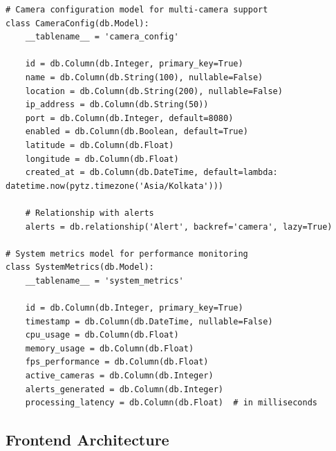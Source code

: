 \documentclass[12pt,a4paper]{article}
\begin{document}
\begin{lstlisting}
# Camera configuration model for multi-camera support
class CameraConfig(db.Model):
    __tablename__ = 'camera_config'
    
    id = db.Column(db.Integer, primary_key=True)
    name = db.Column(db.String(100), nullable=False)
    location = db.Column(db.String(200), nullable=False)
    ip_address = db.Column(db.String(50))
    port = db.Column(db.Integer, default=8080)
    enabled = db.Column(db.Boolean, default=True)
    latitude = db.Column(db.Float)
    longitude = db.Column(db.Float)
    created_at = db.Column(db.DateTime, default=lambda: datetime.now(pytz.timezone('Asia/Kolkata')))
    
    # Relationship with alerts
    alerts = db.relationship('Alert', backref='camera', lazy=True)

# System metrics model for performance monitoring
class SystemMetrics(db.Model):
    __tablename__ = 'system_metrics'
    
    id = db.Column(db.Integer, primary_key=True)
    timestamp = db.Column(db.DateTime, nullable=False)
    cpu_usage = db.Column(db.Float)
    memory_usage = db.Column(db.Float)
    fps_performance = db.Column(db.Float)
    active_cameras = db.Column(db.Integer)
    alerts_generated = db.Column(db.Integer)
    processing_latency = db.Column(db.Float)  # in milliseconds
\end{lstlisting}

\subsection{Frontend Architecture}
\end{document}
